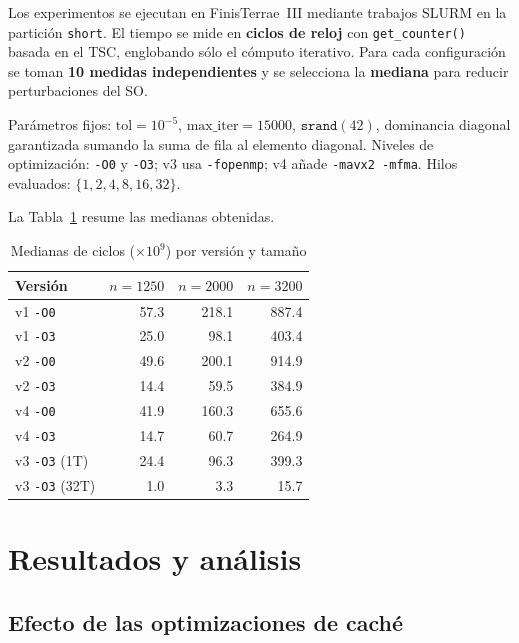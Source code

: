 \documentclass[a4paper,twocolumn]{article}
\begin{document}
Los experimentos se ejecutan en FinisTerrae~III mediante trabajos SLURM en la
partición \texttt{short}.  El tiempo se mide en \textbf{ciclos de reloj} con
\texttt{get\_counter()} basada en el TSC, englobando sólo el cómputo iterativo.
Para cada configuración se toman \textbf{10 medidas independientes} y se
selecciona la \textbf{mediana} para reducir perturbaciones del SO.

Parámetros fijos: $\text{tol}{=}10^{-5}$, $\text{max\_iter}{=}15000$,
$\texttt{srand}(42)$, dominancia diagonal garantizada sumando la suma de fila
al elemento diagonal.  Niveles de optimización: \texttt{-O0} y \texttt{-O3};
v3 usa \texttt{-fopenmp}; v4 añade \mbox{\texttt{-mavx2 -mfma}}.  Hilos evaluados:
$\{1,2,4,8,16,32\}$.

La Tabla~\ref{tab:medianas} resume las medianas obtenidas.

\begin{table}[tb]
{\footnotesize
\caption{Medianas de ciclos ($\times 10^9$) por versión y tamaño}
\label{tab:medianas}
\centering
\setlength{\tabcolsep}{5pt}
\begin{tabular}{lrrr}
\toprule
\textbf{Versión} & $n{=}1250$ & $n{=}2000$ & $n{=}3200$ \\
\midrule
v1 \texttt{-O0}       & 57.3 & 218.1 & 887.4 \\
v1 \texttt{-O3}       & 25.0 &  98.1 & 403.4 \\
v2 \texttt{-O0}       & 49.6 & 200.1 & 914.9 \\
v2 \texttt{-O3}       & 14.4 &  59.5 & 384.9 \\
v4 \texttt{-O0}       & 41.9 & 160.3 & 655.6 \\
v4 \texttt{-O3}       & 14.7 &  60.7 & 264.9 \\
v3 \texttt{-O3} (1T)  & 24.4 &  96.3 & 399.3 \\
v3 \texttt{-O3} (32T) &  1.0 &   3.3 &  15.7 \\
\bottomrule
\end{tabular}
}
\end{table}

\section{Resultados y análisis}

\subsection{Efecto de las optimizaciones de caché}
\end{document}
